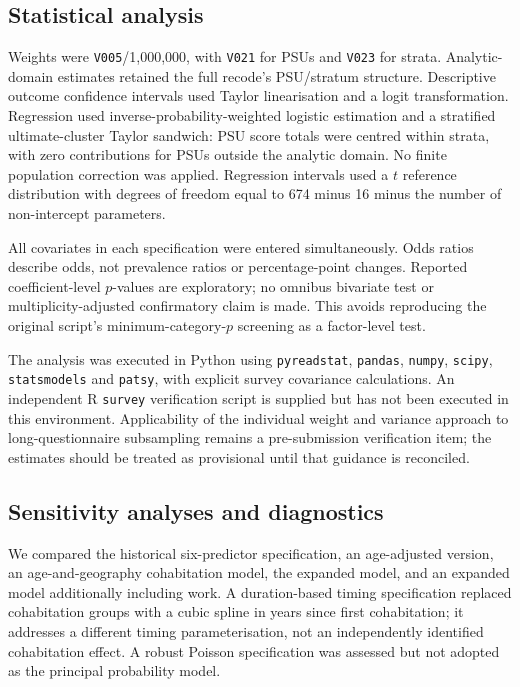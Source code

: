 \documentclass[11pt]{article}
\begin{document}
\subsection{Statistical analysis}
Weights were \texttt{V005}/1,000,000, with \texttt{V021} for PSUs and \texttt{V023} for strata. Analytic-domain estimates retained the full recode's PSU/stratum structure. Descriptive outcome confidence intervals used Taylor linearisation and a logit transformation. Regression used inverse-probability-weighted logistic estimation and a stratified ultimate-cluster Taylor sandwich: PSU score totals were centred within strata, with zero contributions for PSUs outside the analytic domain. No finite population correction was applied. Regression intervals used a $t$ reference distribution with degrees of freedom equal to 674 minus 16 minus the number of non-intercept parameters.\cite{lumley}

All covariates in each specification were entered simultaneously. Odds ratios describe odds, not prevalence ratios or percentage-point changes. Reported coefficient-level $p$-values are exploratory; no omnibus bivariate test or multiplicity-adjusted confirmatory claim is made. This avoids reproducing the original script's minimum-category-$p$ screening as a factor-level test.

The analysis was executed in Python using \texttt{pyreadstat}, \texttt{pandas}, \texttt{numpy}, \texttt{scipy}, \texttt{statsmodels} and \texttt{patsy}, with explicit survey covariance calculations. An independent R \texttt{survey} verification script is supplied but has not been executed in this environment. Applicability of the individual weight and variance approach to long-questionnaire subsampling remains a pre-submission verification item; the estimates should be treated as provisional until that guidance is reconciled.

\subsection{Sensitivity analyses and diagnostics}
We compared the historical six-predictor specification, an age-adjusted version, an age-and-geography cohabitation model, the expanded model, and an expanded model additionally including work. A duration-based timing specification replaced cohabitation groups with a cubic spline in years since first cohabitation; it addresses a different timing parameterisation, not an independently identified cohabitation effect. A robust Poisson specification was assessed but not adopted as the principal probability model.
\end{document}
